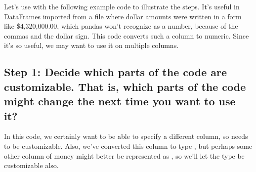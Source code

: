 \documentclass[letterpaper,10pt,english]{sphinxmanual}
\begin{document}
Let’s use with the following example code to illustrate the steps.  It’s useful in DataFrames imported from a file where dollar amounts were written in a form like \$4,320,000.00, which pandas won’t recognize as a number, because of the commas and the dollar sign.  This code converts such a column to numeric.  Since it’s so useful, we may want to use it on multiple columns.

\begin{sphinxVerbatim}[commandchars=\\\{\}]
\PYG{p}{[}\PYG{p}{]}  \PYG{p}{[}\PYG{p}{]}    
\PYG{p}{[}\PYG{p}{]}  \PYG{p}{[}\PYG{p}{]}    
\PYG{p}{[}\PYG{p}{]}  \PYG{p}{[}\PYG{p}{]}          
\end{sphinxVerbatim}


\subsection{Step 1:  Decide which parts of the code are customizable.  That is, which parts of the code might change the next time you want to use it?}
\label{\detokenize{chapter-7-abstraction:step-1-decide-which-parts-of-the-code-are-customizable-that-is-which-parts-of-the-code-might-change-the-next-time-you-want-to-use-it}}
In this code, we certainly want to be able to specify a different column, so  needs to be customizable.  Also, we’ve converted this column to type , but perhaps some other column of money might better be represented as , so we’ll let the type be customizable also.
\end{document}
